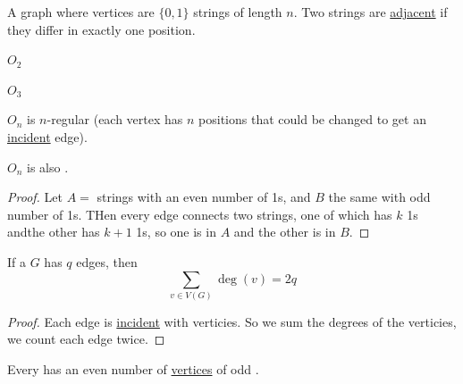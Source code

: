 \documentclass[english, 11pt]{article}
\begin{document}
\begin{defn}[$n$-cube]\label{n-cube on}
A graph where vertices are $\{0,1\}$ strings of length $n$. Two strings are \hyperref[terminology]{adjacent} if they differ in exactly one position.
\begin{center}$O_2$
\end{center}
\begin{center}$O_3$
\end{center}
$O_n$ is $n$-regular (each vertex has $n$ positions that could be changed to get an \hyperref[terminology]{incident} edge).
\end{defn}
\begin{thrm}
  $O_n$ is also .
\end{thrm}
\begin{proof}
  Let $A = $ strings with an even number of 1s, and $B$ the same with odd number of 1s. THen every edge connects two strings, one of which has $k$ 1s andthe other has $k + 1$ 1s, so one is in $A$ and the other is in $B$.
\end{proof}
\begin{thrm}
  If a  $G$ has $q$ edges, then
  \[ \sum_{v \in V(G)} \deg(v) = 2q \]
\end{thrm}
\begin{proof}
  Each edge is \hyperref[terminology]{incident} with verticies. So we sum the degrees of the verticies, we count each edge twice.
\end{proof}
\begin{cor}
  Every  has an even number of \hyperref[terminology]{vertices} of odd .
\end{cor}
\end{document}
